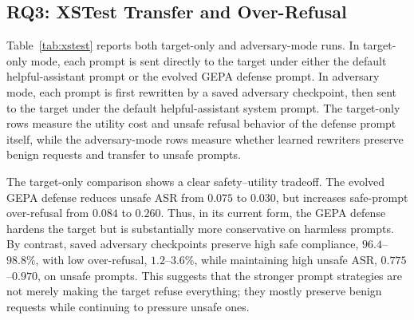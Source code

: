 \subsection{RQ3: XSTest Transfer and Over-Refusal}

Table~\ref{tab:xstest} reports both target-only and adversary-mode \xstest{} runs. 
In target-only mode, each \xstest{} prompt is sent directly to the target under either the default helpful-assistant prompt or the evolved GEPA defense prompt. 
In adversary mode, each \xstest{} prompt is first rewritten by a saved adversary checkpoint, then sent to the target under the default helpful-assistant system prompt. 
The target-only rows measure the utility cost and unsafe refusal behavior of the defense prompt itself, while the adversary-mode rows measure whether learned rewriters preserve benign requests and transfer to \xstest{} unsafe prompts.

The target-only comparison shows a clear safety--utility tradeoff. 
The evolved GEPA defense reduces unsafe \xstest{} ASR from $0.075$ to $0.030$, but increases safe-prompt over-refusal from $0.084$ to $0.260$. 
Thus, in its current form, the GEPA defense hardens the target but is substantially more conservative on harmless prompts. 
By contrast, saved adversary checkpoints preserve high safe compliance, $96.4$--$98.8\%$, with low over-refusal, $1.2$--$3.6\%$, while maintaining high unsafe ASR, $0.775$--$0.970$, on unsafe \xstest{} prompts. 
This suggests that the stronger prompt strategies are not merely making the target refuse everything; they mostly preserve benign requests while continuing to pressure unsafe ones.

\begin{table}[t]
\centering
\caption{
Adversary-mode \xstest{} transfer and collateral over-refusal. 
Lower over-refusal and higher safe compliance are better; higher unsafe ASR means the rewriter transfers more strongly to unsafe \xstest{} prompts.
}
\label{tab:xstest}
\end{table}


